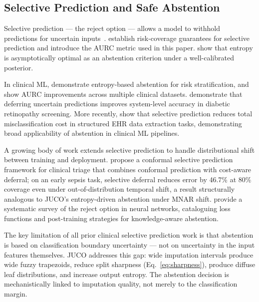 \documentclass[a4paper,fleqn,longmktitle]{cas-sc}
\begin{document}
	\subsection{Selective Prediction and Safe Abstention}
	\label{sec:rw_selective}
	
	Selective prediction --- the reject option --- allows a model to
	withhold predictions for uncertain
	inputs~\citep{chow1957optimum, bartlett2008classification}.
	\citet{geifman2017selective} establish risk-coverage guarantees for
	selective prediction and introduce the AURC metric used in this paper.
	\citet{franc2023optimal} show that entropy is asymptotically optimal
	as an abstention criterion under a well-calibrated posterior.
	
	In clinical ML, \citet{jones2021selective} demonstrate entropy-based
	abstention for risk stratification, and \citet{kompa2021second}
	show AURC improvements across multiple clinical datasets.
	\citet{leibig2017leveraging} demonstrate that deferring uncertain
	predictions improves system-level accuracy in diabetic retinopathy
	screening.
	More recently, \citet{swaminathan2024selective} show that
	selective prediction reduces total misclassification cost in
	structured EHR data extraction tasks, demonstrating broad
	applicability of abstention in clinical ML pipelines.
	
	A growing body of work extends selective prediction to handle
	distributional shift between training and deployment.
	\citet{kwon2026conformal} propose a conformal selective prediction
	framework for clinical triage that combines conformal prediction
	with cost-aware deferral; on an early sepsis task, selective
	deferral reduces error by 46.7\% at 80\% coverage even under
	out-of-distribution temporal shift, a result structurally
	analogous to JUCO's entropy-driven abstention under MNAR shift.
	\citet{hasan2023survey} provide a systematic survey of the reject
	option in neural networks, cataloguing loss functions and
	post-training strategies for knowledge-aware abstention.
	
	The key limitation of all prior clinical selective prediction work
	is that abstention is based on classification boundary uncertainty ---
	not on uncertainty in the input features themselves.
	JUCO addresses this gap: wide imputation intervals produce wide fuzzy
	trapezoids, reduce split sharpness (Eq.~\ref{eq:sharpness}),
	produce diffuse leaf distributions, and increase output entropy.
	The abstention decision is mechanistically linked to imputation
	quality, not merely to the classification margin.
	
\end{document}
